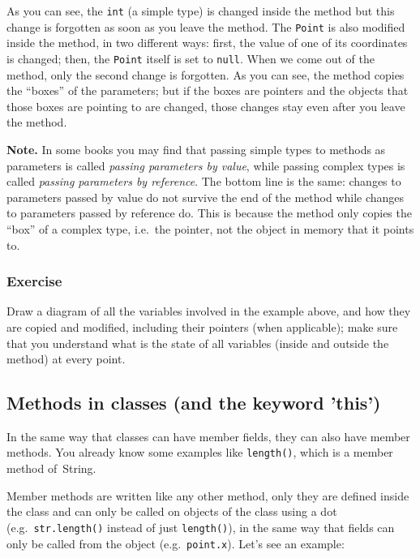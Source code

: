 As you can see, the \verb+int+ (a simple type) is changed inside the
method but this change is forgotten as soon as you leave the
method. The \verb+Point+ is also modified inside the method, 
in two different
ways: first, the value of one of its coordinates is changed; then, the
\verb+Point+ itself is set to \verb+null+. When we come out of the method,
only the second change is forgotten. As you can see, the method copies
the ``boxes'' of the parameters; but if the boxes are pointers and the
objects that those boxes are pointing to are changed, those changes stay
even after you leave the method. 

\textbf{Note.} In some books you may find that passing simple types to 
methods as parameters is called \emph{passing parameters by value}, while
passing complex types is called \emph{passing parameters by reference}. The
bottom line is the same: changes to parameters passed by value do not
survive the end of the method while changes to parameters passed by
reference do. This is because the method only copies the ``box'' of a
complex type, i.e.~the pointer, not the object in memory that it points to. 

\subsubsection{Exercise}
\label{sec:exerciseff}

Draw a diagram of all the variables involved in the example above, 
and how they are copied and modified, including their pointers (when
applicable); 
make sure that you understand what is the state of all variables
(inside and outside the method) at every point. 

\subsection{Methods in classes (and the keyword 'this')}
\label{sec:methods-classes}

In the same way that classes can have member fields, they can also have
member methods. You already know some examples like \verb+length()+,
which is a member method of~String. 

Member methods are written like any other method, only they are
defined inside the class and can only be called on objects of the
class using a dot (e.g.~\verb+str.length()+ instead 
of just \verb+length()+), 
in the same way that fields can only
be called from the object (e.g.~\verb+point.x+). Let's see an example: 

